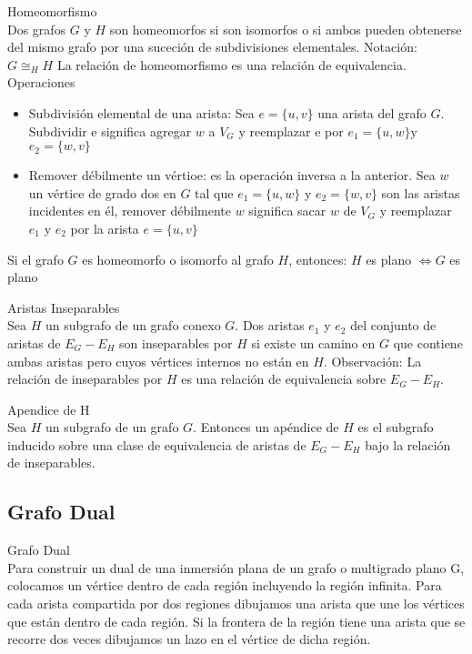\documentclass{article}
\begin{document}
\begin{defn}
Homeomorfismo \\
Dos grafos $G$ y $H$ son homeomorfos si son isomorfos o si ambos pueden obtenerse del mismo grafo por una suceción de subdivisiones elementales. Notación: $G \cong_{H} H$
La relación de homeomorfismo es una relación de equivalencia. \\
Operaciones
\begin{itemize}
    \item Subdivisión elemental de una arista: Sea $e=\{u, v\}$ una arista del grafo $G .$ Subdividir e significa agregar $w$ a $V_{G}$ y reemplazar e por $e_{1}=\{u, w\} \mathrm{y}$ $e_{2}=\{w, v\}$
    \item Remover débilmente un vértioe: es la operación inversa a la anterior. Sea $w$ un vértice de grado dos en $G$ tal que $e_{1}=\{u, w\}$ y $e_{2}=\{w, v\}$ son las aristas incidentes en él, remover débilmente $w$ significa sacar $w$ de $V_{G}$ y reemplazar $e_{1}$ y $e_{2}$ por la arista $e=\{u, v\}$

\end{itemize}
Si el grafo $G$ es homeomorfo o isomorfo al grafo $H$, entonces:
$H$ es plano $\Leftrightarrow G$ es plano
\end{defn}

\begin{defn}
Aristas Inseparables \\
Sea $H$ un subgrafo de un grafo conexo $G .$ Dos aristas $e_{1}$ y $e_{2}$ del conjunto de aristas de $E_{G}-E_{H}$ son inseparables por $H$ si existe un camino en $G$ que contiene ambas aristas pero cuyos vértices internos no están en $H$.
Observación:
La relación de inseparables por $H$ es una relación de equivalencia sobre $E_{G}-E_{H}$.
\end{defn}

\begin{defn}
Apendice de H \\ Sea $H$ un subgrafo de un grafo $G$. Entonces un apéndice de $H$ es el subgrafo inducido sobre una clase de equivalencia de aristas de $E_{G}-E_{H}$ bajo la relación de inseparables.
\end{defn}

\subsection{Grafo Dual}

\begin{defn}
Grafo Dual \\ Para construir un dual de una inmersión plana de un grafo o multigrado plano G, colocamos un vértice dentro de cada región incluyendo la región infinita. Para cada arista compartida por dos regiones dibujamos una arista que une los vértices que están dentro de cada región. Si la frontera de la región tiene una arista que se recorre dos veces dibujamos un lazo en el vértice de dicha región.
\end{defn}
 
\end{document}
